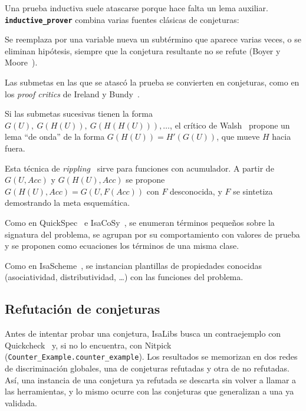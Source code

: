 \documentclass[11pt,a4paper]{article}
\newcommand{\isa}[1]{\texttt{#1}}
\newcommand{\cmd}[1]{\textbf{\texttt{#1}}}
\theoremstyle{definition}
\theoremstyle{remark}
\begin{document}
Una prueba inductiva suele atascarse porque hace falta un lema auxiliar.
\cmd{inductive\_prover} combina varias fuentes clásicas de conjeturas:
\begin{description}[nosep,font=\normalfont\bfseries]
  \item[Generalización] Se reemplaza por una variable nueva un subtérmino que
        aparece varias veces, o se eliminan hipótesis, siempre que la conjetura
        resultante no se refute (Boyer y Moore~\cite{boyer-moore}).
  \item[Análisis de fallos] Las submetas en las que se atascó la prueba se
        convierten en conjeturas, como en los \emph{proof critics} de Ireland y
        Bundy~\cite{ireland-bundy}.
  \item[Crítico de divergencia] Si las submetas sucesivas tienen la forma
        $G(U),\ G(H(U)),\ G(H(H(U))),\ldots$, el crítico de Walsh~\cite{walsh}
        propone un lema ``de onda'' de la forma $G(H(U)) = H'(G(U))$, que mueve
        $H$ hacia fuera.
  \item[Reglas de onda transversales] Esta técnica de
        \emph{rippling}~\cite{rippling} sirve para funciones con acumulador. A
        partir de $G(U,\mathit{Acc})$ y $G(H(U),\mathit{Acc})$ se propone
        $G(H(U),\mathit{Acc}) = G(U, F(\mathit{Acc}))$ con $F$ desconocida, y $F$
        se sintetiza demostrando la meta esquemática.
  \item[Exploración de teorías] Como en QuickSpec~\cite{quickspec} e
        IsaCoSy~\cite{isacosy}, se enumeran términos pequeños sobre la signatura
        del problema, se agrupan por su comportamiento con valores de prueba y se
        proponen como ecuaciones los términos de una misma clase.
  \item[Esquemas] Como en IsaScheme~\cite{montano2012}, se instancian plantillas
        de propiedades conocidas (asociatividad, distributividad, \ldots) con las
        funciones del problema.
\end{description}

\subsection{Refutación de conjeturas}

Antes de intentar probar una conjetura, IsaLibs busca un contraejemplo con
Quickcheck~\cite{quickcheck} y, si no lo encuentra, con Nitpick~\cite{nitpick}
(\isa{Counter\_Example.counter\_example}). Los resultados se memorizan en dos redes de
discriminación globales, una de conjeturas refutadas y otra de no refutadas. Así, una
instancia de una conjetura ya refutada se descarta sin volver a llamar a las
herramientas, y lo mismo ocurre con las conjeturas que generalizan a una ya validada.
\end{document}
